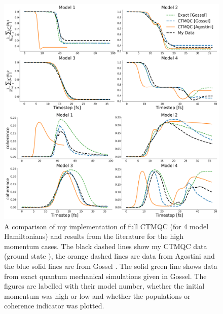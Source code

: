 \begin{figure}[ht]
	\includegraphics[width=\textwidth]{../img/CTMQC/TullyModels/CTMQC_highMom.png}
	\caption{\label{fig:LitCompCTMQCTullyHigh}A comparison of my implementation of full CTMQC (for 4 model Hamiltonians) and results from the literature for the high momentum cases. The black dashed lines show my CTMQC data (ground state ), the orange dashed lines are data from Agostini \cite{agostini_quantum-classical_2016} and the blue solid lines are from Gossel \cite{gossel_coupled-trajectory_2018}. The solid green line shows data from exact quantum mechanical simulations given in Gossel. The figures are labelled with their model number, whether the initial momentum was high or low and whether the populations or coherence indicator was plotted.}
\end{figure}

